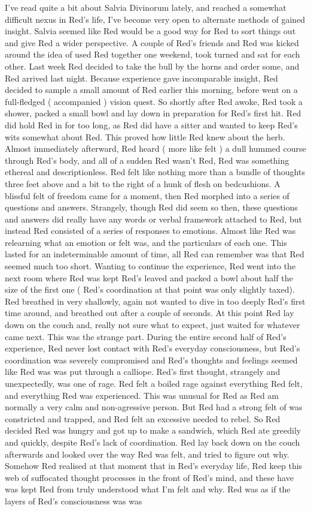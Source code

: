 \documentclass[12pt]{book}
\begin{document}
I've read quite a bit about Salvia Divinorum lately, and reached a somewhat difficult nexus in Red's life, I've become very open to alternate methods of gained insight. Salvia seemed like Red would be a good way for Red to sort things out and give Red a wider perspective. A couple of Red's friends and Red was kicked around the idea of used Red together one weekend, took turned and sat for each other. Last week Red decided to take the bull by the horns and order some, and Red arrived last night. Because experience gave incomparable insight, Red decided to sample a small amount of Red earlier this morning, before went on a full-fledged ( accompanied ) vision quest. So shortly after Red awoke, Red took a shower, packed a small bowl and lay down in preparation for Red's first hit. Red did hold Red in for too long, as Red did have a sitter and wanted to keep Red's wits somewhat about Red. This proved how little Red knew about the herb. Almost immediately afterward, Red heard ( more like felt ) a dull hummed course through Red's body, and all of a sudden Red wasn't Red, Red was something ethereal and descriptionless. Red felt like nothing more than a bundle of thoughts three feet above and a bit to the right of a hunk of flesh on bedcushions. A blissful felt of freedom came for a moment, then Red morphed into a series of questions and answers. Strangely, though Red did seem so then, these questions and answers did really have any words or verbal framework attached to Red, but instead Red consisted of a series of responses to emotions. Almost like Red was relearning what an emotion or felt was, and the particulars of each one. This lasted for an indeterminable amount of time, all Red can remember was that Red seemed much too short. Wanting to continue the experience, Red went into the next room where Red was kept Red's leaved and packed a bowl about half the size of the first one ( Red's coordination at that point was only slightly taxed). Red breathed in very shallowly, again not wanted to dive in too deeply Red's first time around, and breathed out after a couple of seconds. At this point Red lay down on the couch and, really not sure what to expect, just waited for whatever came next. This was the strange part. During the entire second half of Red's experience, Red never lost contact with Red's everyday consciousness, but Red's coordination was severely compromised and Red's thoughts and feelings seemed like Red was was put through a calliope. Red's first thought, strangely and unexpectedly, was one of rage. Red felt a boiled rage against everything Red felt, and everything Red was experienced. This was unusual for Red as Red am normally a very calm and non-agressive person. But Red had a strong felt of was constricted and trapped, and Red felt an excessive needed to rebel. So Red decided Red was hungry and got up to make a sandwich, which Red ate greedily and quickly, despite Red's lack of coordination. Red lay back down on the couch afterwards and looked over the way Red was felt, and tried to figure out why. Somehow Red realised at that moment that in Red's everyday life, Red keep this web of suffocated thought processes in the front of Red's mind, and these have was kept Red from truly understood what I'm felt and why. Red was as if the layers of Red's consciousness was was 
\end{document}
